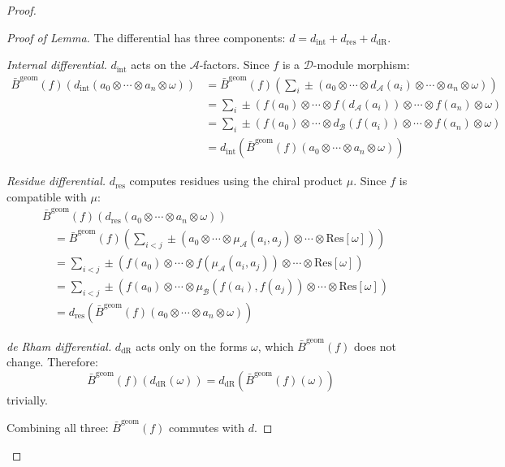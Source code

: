 \begin{proof}
\begin{proof}[Proof of Lemma]
The differential has three components: $d = d_{\text{int}} + d_{\text{res}} + d_{\text{dR}}$.

\emph{Internal differential.} $d_{\text{int}}$ acts on the $\mathcal{A}$-factors. Since $f$ is a $\mathcal{D}$-module morphism:
\begin{align*}
\bar{B}^{\text{geom}}(f)(d_{\text{int}}(a_0 \otimes \cdots \otimes a_n \otimes \omega))
&= \bar{B}^{\text{geom}}(f)\left(\sum_i \pm (a_0 \otimes \cdots \otimes d_{\mathcal{A}}(a_i) \otimes \cdots \otimes a_n \otimes \omega)\right) \\
&= \sum_i \pm (f(a_0) \otimes \cdots \otimes f(d_{\mathcal{A}}(a_i)) \otimes \cdots \otimes f(a_n) \otimes \omega) \\
&= \sum_i \pm (f(a_0) \otimes \cdots \otimes d_{\mathcal{B}}(f(a_i)) \otimes \cdots \otimes f(a_n) \otimes \omega) \\
&= d_{\text{int}}(\bar{B}^{\text{geom}}(f)(a_0 \otimes \cdots \otimes a_n \otimes \omega))
\end{align*}

\emph{Residue differential.} $d_{\text{res}}$ computes residues using the chiral product $\mu$. Since $f$ is compatible with $\mu$:
\begin{align*}
&\bar{B}^{\text{geom}}(f)(d_{\text{res}}(a_0 \otimes \cdots \otimes a_n \otimes \omega)) \\
&\quad = \bar{B}^{\text{geom}}(f)\left(\sum_{i<j} \pm (a_0 \otimes \cdots \otimes \mu_\mathcal{A}(a_i, a_j) \otimes \cdots \otimes \text{Res}[\omega])\right) \\
&\quad = \sum_{i<j} \pm (f(a_0) \otimes \cdots \otimes f(\mu_\mathcal{A}(a_i, a_j)) \otimes \cdots \otimes \text{Res}[\omega]) \\
&\quad = \sum_{i<j} \pm (f(a_0) \otimes \cdots \otimes \mu_\mathcal{B}(f(a_i), f(a_j)) \otimes \cdots \otimes \text{Res}[\omega]) \\
&\quad = d_{\text{res}}(\bar{B}^{\text{geom}}(f)(a_0 \otimes \cdots \otimes a_n \otimes \omega))
\end{align*}

\emph{de Rham differential.} $d_{\text{dR}}$ acts only on the forms $\omega$, which $\bar{B}^{\text{geom}}(f)$ does not change. Therefore:
\[\bar{B}^{\text{geom}}(f)(d_{\text{dR}}(\omega)) = d_{\text{dR}}(\bar{B}^{\text{geom}}(f)(\omega))\]
trivially.

Combining all three: $\bar{B}^{\text{geom}}(f)$ commutes with $d$. \qedhere
\end{proof}


\end{proof}
